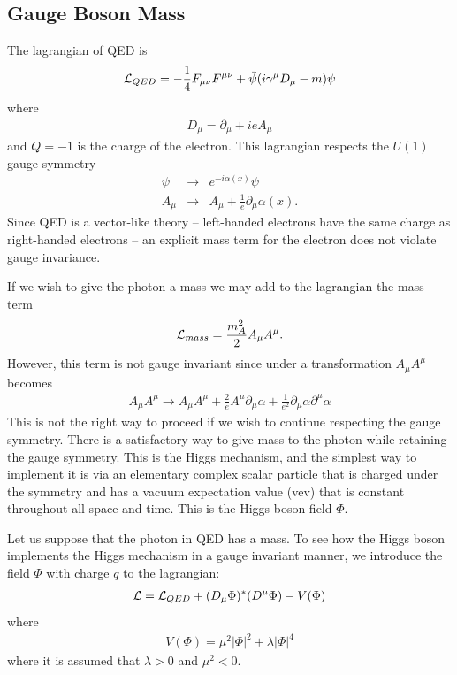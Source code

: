 \documentclass[12pt]{article}
\def\beq{\begin{eqnarray}}
\def\eeq{\end{eqnarray}}
\def\bea{\begin{eqnarray}}
\def\Dslash{\gamma^\mu D_\mu}
\begin{document}
\noindent
\subsection{Gauge Boson Mass}

The lagrangian of QED is
\beq
{\cal L}_{QED}=-\frac{1}{4}F_{\mu\nu}F^{\mu\nu}+\bar \psi (i\Dslash -m)\psi
\eeq
where 
\beq
D_\mu=\partial_\mu +ieA_\mu
\eeq
and $Q=-1$ is the charge of the electron.
This lagrangian respects the $U(1)$ gauge symmetry
\bea
\psi & \to & e^{-i\alpha(x)}\psi \\
A_\mu & \to & A_\mu+\frac{1}{e}\partial_\mu \alpha(x).
\eeq
Since QED is a vector-like theory -- left-handed electrons have the same charge as right-handed electrons --  an explicit mass term for the electron does not violate gauge invariance. 

If we wish to give the photon a mass we may add to the lagrangian the mass term
\beq
{\cal L}_{mass}=\frac{m_A^2}{2}A_\mu A^\mu .
\eeq
However, this term is not gauge invariant since under a transformation $A_\mu A^\mu$ becomes
\beq
A_\mu A^\mu\to A_\mu A^\mu+\frac{2}{e}A^\mu\partial_\mu\alpha+\frac{1}{e^2}\partial_\mu \alpha\partial^\mu\alpha
\eeq
This is not the right way to proceed if we wish to continue respecting the gauge symmetry. 
There is a satisfactory way to give mass to the photon while retaining the gauge symmetry. This is the Higgs mechanism, and the simplest way to implement it is via an elementary complex scalar particle that is charged under the symmetry and has a vacuum expectation value (vev) that is constant throughout all space and time.  This is the Higgs boson field $\Phi$.

Let us suppose that the photon in QED has a mass. To see how the Higgs boson implements the Higgs mechanism in a gauge invariant manner,  we 
introduce the field $\Phi$ with charge $q$  to the lagrangian:
\beq
{\cal L}={\cal L}_{QED}+(D_\mu\Phi)^*(D^\mu \Phi)-V(\Phi)
\eeq
where 
\beq
V(\Phi)=\mu^2|\Phi|^2+\lambda |\Phi|^4
\eeq
where it is assumed that $\lambda>0$ and $\mu^2<0$.  
\end{document}
